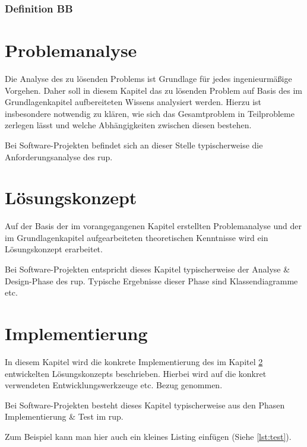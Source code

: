 \documentclass[oneside]{ausarbeitung}
\begin{document}
\blindtext

\subsection{Definition BB}
\label{sub:definitionbb}

\blindtext

\chapter{Problemanalyse}
\label{cha:problemanalyse}

Die Analyse des zu lösenden Problems ist Grundlage für jedes 
ingenieurmäßige Vorgehen. Daher soll in diesem Kapitel das zu lösenden 
Problem auf Basis des im Grundlagenkapitel aufbereiteten Wissens 
analysiert werden. Hierzu ist insbesondere notwendig zu klären, wie sich 
das Gesamtproblem in Teilprobleme zerlegen lässt und welche 
Abhängigkeiten zwischen diesen bestehen.

Bei Software-Projekten befindet sich an dieser Stelle typischerweise die 
Anforderungsanalyse des \ac{rup}.

\chapter{Lösungskonzept}
\label{cha:loesungskonzept}

Auf der Basis der im vorangegangenen Kapitel erstellten Problemanalyse 
und der im Grundlagenkapitel aufgearbeiteten theoretischen Kenntnisse 
wird ein Lösungskonzept erarbeitet.

Bei Software-Projekten entspricht dieses Kapitel typischerweise der 
Analyse \& Design-Phase des \ac{rup}. Typische Ergebnisse dieser Phase sind 
Klassendiagramme etc.

\chapter{Implementierung}
\label{cha:implementierung}

In diesem Kapitel wird die konkrete Implementierung des im Kapitel
\ref{cha:loesungskonzept} entwickelten Lösungskonzepts beschrieben.
Hierbei wird auf die konkret verwendeten Entwicklungswerkzeuge etc. 
Bezug genommen.

Bei Software-Projekten besteht dieses Kapitel typischerweise aus den 
Phasen Implementierung \& Test im \ac{rup}.

Zum Beispiel kann man hier auch ein kleines Listing einfügen (Siehe \ref{lst:test}).
\end{document}
